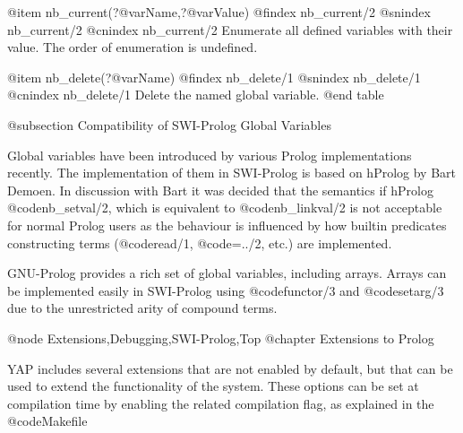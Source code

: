@item nb_current(?@var{Name},?@var{Value})
@findex nb_current/2
@snindex nb_current/2
@cnindex nb_current/2
Enumerate all defined variables with their value. The order of
enumeration is undefined.

@item nb_delete(?@var{Name})
@findex nb_delete/1
@snindex nb_delete/1
@cnindex nb_delete/1
Delete the named global variable.
@end table

@subsection Compatibility of SWI-Prolog Global Variables

Global variables have been introduced by various Prolog
implementations recently.  The implementation of them in SWI-Prolog is
based on hProlog by Bart Demoen. In discussion with Bart it was
decided that the semantics if hProlog @code{nb_setval/2}, which is
equivalent to @code{nb_linkval/2} is not acceptable for normal Prolog
users as the behaviour is influenced by how builtin predicates
constructing terms (@code{read/1}, @code{=../2}, etc.) are implemented.

GNU-Prolog provides a rich set of global variables, including arrays.
Arrays can be implemented easily in SWI-Prolog using @code{functor/3} and
@code{setarg/3} due to the unrestricted arity of compound terms.


@node Extensions,Debugging,SWI-Prolog,Top 
@chapter Extensions to Prolog

YAP includes several extensions that are not enabled by
default, but that can be used to extend the functionality of the
system. These options can be set at compilation time by enabling the
related compilation flag, as explained in the @code{Makefile}

